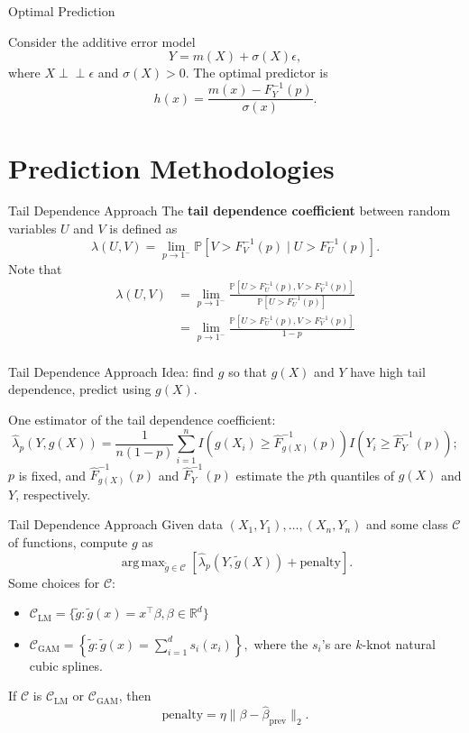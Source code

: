 \documentclass{beamer}
\def\P{\mathbb P}
\def\ind{\perp\!\!\!\perp}
\DeclareMathOperator*{\argmax}{arg\,max}
\begin{document}
\begin{frame}{Optimal Prediction}
    \begin{corollary} Consider the additive error model
    \[
    Y = m(X) + \sigma(X)\epsilon,
    \]
    where $X \ind \epsilon$ and $\sigma(X) > 0$.
    The optimal predictor is 
    \[
    h(x) = \frac{m(x) - F_Y^{-1}(p)}{\sigma(x)}.
    \]
    \end{corollary}
\end{frame}

\section{Prediction Methodologies}

\begin{frame}{Tail Dependence Approach}
    The \textbf{tail dependence coefficient} between random variables $U$ and $V$ is defined as
    \[
    \lambda(U, V) = \lim_{p \to 1^{-}} \P[V > F_V^{-1}(p) \mid U > F_U^{-1}(p)].
    \]
    Note that
    \begin{align*}
        \lambda(U, V) &= \lim_{p \to 1^{-}} \frac{\P[U > F_U^{-1}(p), V > F_V^{-1}(p)]}{\P[U > F_U^{-1}(p)]} \\
        &= \lim_{p \to 1^{-}} \frac{\P[U > F_U^{-1}(p), V > F_V^{-1}(p)]}{1 - p} \\ 
    \end{align*}
\end{frame}

\begin{frame}{Tail Dependence Approach}
    Idea: find $g$ so that $g(X)$ and $Y$ have high tail dependence, predict using $g(X)$.

    \medskip
    
    One estimator of the tail dependence coefficient:
    \[
    \hat{\lambda}_p(Y, g(X)) = \frac{1}{n(1 - p)}\sum_{i = 1}^n I(g(X_i) \ge \hat{F}_{g(X)}^{-1}(p))I(Y_i \ge \hat{F}_{Y}^{-1}(p));
    \]
    $p$ is fixed, and $\hat{F}_{g(X)}^{-1}(p)$ and $\hat{F}_{Y}^{-1}(p)$ estimate the $p$th quantiles of $g(X)$ and $Y$, respectively.
\end{frame}

\begin{frame}{Tail Dependence Approach}
    Given data $(X_1, Y_1), \ldots, (X_n, Y_n)$ and some class $\mathcal{C}$ of functions, compute $g$ as 
    \[
    \argmax_{\tilde{g} \in \mathcal{C}} [\hat{\lambda}_p(Y, \tilde{g}(X)) + \text{penalty}].
    \]
    Some choices for $\mathcal{C}$:
    \begin{itemize}
        \item $\mathcal{C}_{\text{LM}} = \{\tilde{g} : \tilde{g}(x) = x^{\top}\beta, \beta \in \mathbb{R}^d\}$
        \item $\mathcal{C}_{\text{GAM}} = \left\{\tilde{g} : \tilde{g}(x) = \sum_{i = 1}^d s_i(x_i)\right\},$
        where the $s_i$'s are $k$-knot natural cubic splines.
    \end{itemize}
    If $\mathcal{C}$ is $\mathcal{C}_{\text{LM}}$ or $\mathcal{C}_{\text{GAM}}$, then
    \[
    \text{penalty} = \eta\|\beta - \hat{\beta}_{\text{prev}}\|_2.
    \]
\end{frame}
\end{document}
